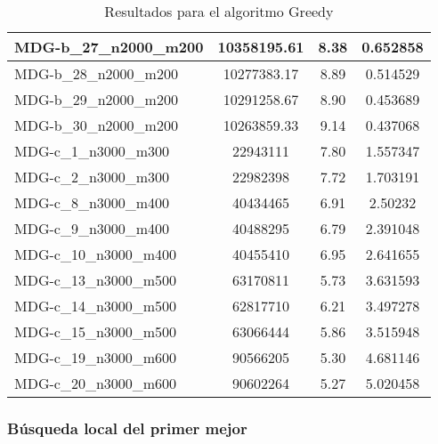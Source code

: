 \documentclass[10pt,a4paper]{article}
\begin{document}
\begin{table}[H]
\begin{center}
\begin{tabular}{|l|c|c|c|}
			MDG-b\_27\_n2000\_m200 & 10358195.61 & 8.38 & 0.652858 \\ \hline
			MDG-b\_28\_n2000\_m200 & 10277383.17 & 8.89 & 0.514529 \\ \hline
			MDG-b\_29\_n2000\_m200 & 10291258.67 & 8.90 & 0.453689 \\ \hline
			MDG-b\_30\_n2000\_m200 & 10263859.33 & 9.14 & 0.437068 \\ \hline
			MDG-c\_1\_n3000\_m300 & 22943111 & 7.80 & 1.557347 \\ \hline
			MDG-c\_2\_n3000\_m300 & 22982398 & 7.72 & 1.703191 \\ \hline
			MDG-c\_8\_n3000\_m400 & 40434465 & 6.91 & 2.50232 \\ \hline
			MDG-c\_9\_n3000\_m400 & 40488295 & 6.79 & 2.391048 \\ \hline
			MDG-c\_10\_n3000\_m400 & 40455410 & 6.95 & 2.641655 \\ \hline
			MDG-c\_13\_n3000\_m500 & 63170811 & 5.73 & 3.631593 \\ \hline
			MDG-c\_14\_n3000\_m500 & 62817710 & 6.21 & 3.497278 \\ \hline
			MDG-c\_15\_n3000\_m500 & 63066444 & 5.86 & 3.515948 \\ \hline
			MDG-c\_19\_n3000\_m600 & 90566205 & 5.30 & 4.681146 \\ \hline
			MDG-c\_20\_n3000\_m600 & 90602264 & 5.27 & 5.020458 \\ \hline
		\end{tabular}
	\end{center}
	\caption{Resultados para el algoritmo Greedy}
	\label{}
\end{table}
\newpage
\subsubsection{Búsqueda local del primer mejor}
\end{document}
